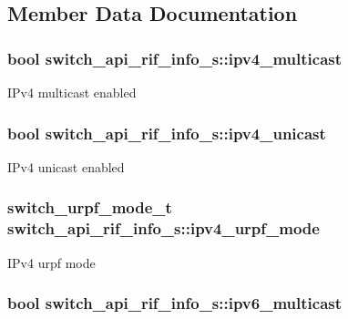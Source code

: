 \subsection{Member Data Documentation}
\hypertarget{structswitch__api__rif__info__s_aa0efa90de6c259b56c25f1af1955f30a}{
\subsubsection[{ipv4\+\_\+multicast}]{\setlength{\rightskip}{0pt plus 5cm}bool switch\+\_\+api\+\_\+rif\+\_\+info\+\_\+s\+::ipv4\+\_\+multicast}}\label{structswitch__api__rif__info__s_aa0efa90de6c259b56c25f1af1955f30a}
I\+Pv4 multicast enabled \hypertarget{structswitch__api__rif__info__s_a75996488db66f18f7f48fdc1b3096230}{
\subsubsection[{ipv4\+\_\+unicast}]{\setlength{\rightskip}{0pt plus 5cm}bool switch\+\_\+api\+\_\+rif\+\_\+info\+\_\+s\+::ipv4\+\_\+unicast}}\label{structswitch__api__rif__info__s_a75996488db66f18f7f48fdc1b3096230}
I\+Pv4 unicast enabled \hypertarget{structswitch__api__rif__info__s_ab64a284f279f9350d360bd4e499c992a}{
\subsubsection[{ipv4\+\_\+urpf\+\_\+mode}]{\setlength{\rightskip}{0pt plus 5cm}switch\+\_\+urpf\+\_\+mode\+\_\+t switch\+\_\+api\+\_\+rif\+\_\+info\+\_\+s\+::ipv4\+\_\+urpf\+\_\+mode}}\label{structswitch__api__rif__info__s_ab64a284f279f9350d360bd4e499c992a}
I\+Pv4 urpf mode \hypertarget{structswitch__api__rif__info__s_ad00137adfd113d7e9e5f849430466809}{
\subsubsection[{ipv6\+\_\+multicast}]{\setlength{\rightskip}{0pt plus 5cm}bool switch\+\_\+api\+\_\+rif\+\_\+info\+\_\+s\+::ipv6\+\_\+multicast}}\label{structswitch__api__rif__info__s_ad00137adfd113d7e9e5f849430466809}
